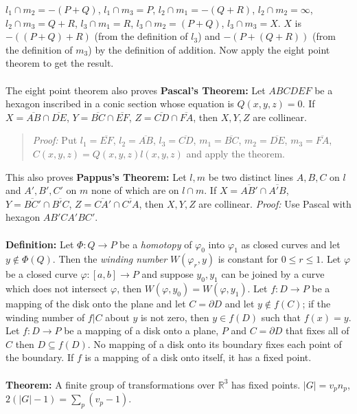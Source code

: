 $l_1 \cap m_2= -(P+Q)$,
$l_1 \cap m_3= P$,
$l_2 \cap m_1= -(Q+R)$,
$l_2 \cap m_2= \infty$,
$l_2 \cap m_3= Q+R$,
$l_3 \cap m_1= R$,
$l_3 \cap m_2= (P+Q)$,
$l_3 \cap m_3= X$. $X$ is $-((P+Q)+R)$ (from the definition of $l_3$) and $-(P+(Q+R))$ 
(from the definition of $m_3$) by the definition of addition.  Now
apply the eight point theorem to get the result.
\\
\\
The eight point theorem also proves {\bf Pascal's Theorem:}
Let $ABCDEF$ be a hexagon inscribed in a
conic section whose equation is $Q(x,y,z)=0$.  If 
$X= {\overline {AB}} \cap  {\overline {DE}}$,
$Y= {\overline {BC}} \cap  {\overline {EF}}$,
$Z= {\overline {CD}} \cap  {\overline {FA}}$, then $X, Y, Z$ are collinear.  
\begin{quote}
\emph{Proof:}
Put
$l_1 = {\overline {EF}}$,
$l_2 = {\overline {AB}}$,
$l_3 = {\overline {CD}}$,
$m_1 = {\overline {BC}}$,
$m_2 = {\overline {DE}}$,
$m_3 = {\overline {FA}}$, $C(x,y,z)= Q(x,y,z)l(x,y,z)$ and apply the theorem. 
\end{quote}
This also proves {\bf Pappus's Theorem:} Let $l, m$ be two distinct lines $A,B,C$ on $l$ and
$A', B', C'$ on $m$ none of which are on $l \cap m$.  If
$X= {\overline {AB'}} \cap  {\overline {A' B}}$,
$Y= {\overline {BC'}} \cap  {\overline {B'C}}$,
$Z= {\overline {CA'}} \cap  {\overline {C'A}}$, then $X, Y, Z$ are collinear.  \emph{Proof:}
Use Pascal with hexagon $AB'CA'BC'$.
\\
\\
{\bf Definition:}
Let $\Phi: Q \rightarrow P$ be a \emph{homotopy} of $\varphi_0$ into $\varphi_1$ as closed
curves and let $y \notin \Phi(Q)$.  Then the \emph{winding number}
$W(\varphi_r, y)$ is constant
for $0 \le r \le 1$.  Let $\varphi$ be a closed curve $\varphi: [a,b] \rightarrow P$ and
suppose $y_0 , y_1$ can be joined by a curve which does not intersect $\varphi$, then
$W(\varphi, y_0 )= W(\varphi , y_1)$.  Let $f: D \rightarrow P$ be a mapping of
the disk onto the plane and let $C= \partial D$ and let $y \notin f(C)$;
if the winding number
of $f|C$ about $y$ is not zero, then $y \in f(D)$ such that $f(x)=y$.
Let $f: D \rightarrow P$ be a mapping of a disk onto a plane, $P$ and $C= \partial D$
that fixes all of $C$ then $D \subseteq f(D)$.  No mapping of a disk onto its boundary
fixes each point of the boundary.  If $f$ is a mapping of a disk onto itself, it has
a fixed point. 
\\
\\
{\bf Theorem:}
A finite group of transformations over ${\mathbb R}^3$ has fixed points. $|G|= v_p n_p$,
$2(|G| -1) = \sum_p (v_p - 1)$.
